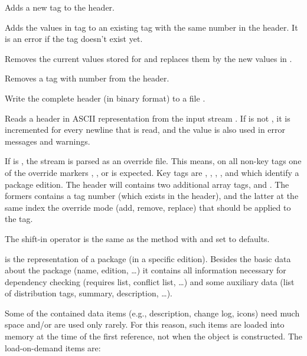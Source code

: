 \documentclass[10pt]{article}
\begin{document}
Adds a new tag  to the header.

Adds the values in tag  to an existing tag with the same number
in the header. It is an error if the tag doesn't exist yet.

Removes the current values stored for  and replaces them by
the new values in .

Removes a tag with number  from the header.

Write the complete header (in binary format) to a file .

Reads a header in ASCII representation from the input stream .
If  is not , it is incremented for every newline
that is read, and the value is also used in error messages and
warnings.

If  is \true, the stream is parsed as an
override file. This means, on all non-key tags one of the override
markers \val{+}, \val{-}, or \val{!} is expected. Key tags are
, , , , and
 which identify a package edition. The header will
contains two additional  array tags,
 and . The
formers contains a tag number (which exists in the header), and the
latter at the same index the override mode (add, remove, replace) that
should be applied to the tag.

The shift-in operator is the same as the  method with
 and  set to defaults.




 is the representation of a package (in a specific
edition). Besides the basic data about the package (name, edition,
\dots) it contains all information necessary for dependency checking
(requires list, conflict list, \dots) and some auxiliary data (list of
distribution tags, summary, description, \dots).

Some of the contained data items (e.g., description, change log,
icons) need much space and/or are used only rarely. For this reason,
such items are loaded into memory at the time of the first reference,
not when the object is constructed. The load-on-demand items are:
\end{document}
